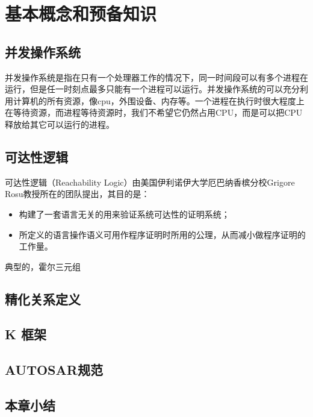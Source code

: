 
\chapter{基本概念和预备知识}



\section{并发操作系统}
并发操作系统是指在只有一个处理器工作的情况下，同一时间段可以有多个进程在运行，但是任一时刻点最多只能有一个进程可以运行。并发操作系统的可以充分利用计算机的所有资源，像cpu，外围设备、内存等。一个进程在执行时很大程度上在等待资源，而进程等待资源时，我们不希望它仍然占用CPU，而是可以把CPU释放给其它可以运行的进程。
\section{可达性逻辑}
可达性逻辑（Reachability Logic）由美国伊利诺伊大学厄巴纳香槟分校Grigore Rosu教授所在的团队提出，其目的是：
\begin{itemize}
	\item 构建了一套语言无关的用来验证系统可达性的证明系统；
	\item 所定义的语言操作语义可用作程序证明时所用的公理，从而减小做程序证明的工作量。
\end{itemize}
典型的，霍尔三元组
\section{精化关系定义}
\section{K 框架}
\section{AUTOSAR规范}


\section{本章小结}

\label{ch2}



